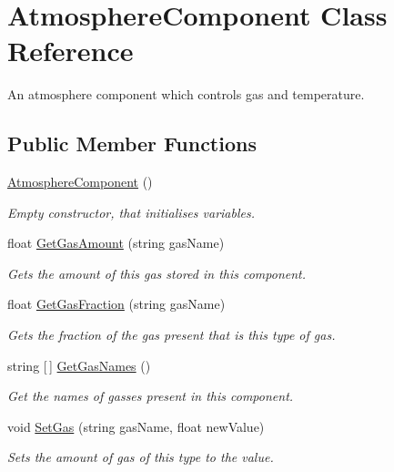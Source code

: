 \hypertarget{class_atmosphere_component}{}\section{Atmosphere\+Component Class Reference}
\label{class_atmosphere_component}


An atmosphere component which controls gas and temperature.  


\subsection*{Public Member Functions}
\begin{DoxyCompactItemize}
\item 
\hyperlink{class_atmosphere_component_aa1d8f0e689d42f6ae5663473406db9be}{Atmosphere\+Component} ()
\begin{DoxyCompactList}\small\item\em Empty constructor, that initialises variables. \end{DoxyCompactList}\item 
float \hyperlink{class_atmosphere_component_af15c6de153494ee1908429e72575b08b}{Get\+Gas\+Amount} (string gas\+Name)
\begin{DoxyCompactList}\small\item\em Gets the amount of this gas stored in this component. \end{DoxyCompactList}\item 
float \hyperlink{class_atmosphere_component_afb20b22d2f7601b7647a716c1baf4a27}{Get\+Gas\+Fraction} (string gas\+Name)
\begin{DoxyCompactList}\small\item\em Gets the fraction of the gas present that is this type of gas. \end{DoxyCompactList}\item 
string \mbox{[}$\,$\mbox{]} \hyperlink{class_atmosphere_component_a6a41cdeb590b5c1b4fe5336fc62039ab}{Get\+Gas\+Names} ()
\begin{DoxyCompactList}\small\item\em Get the names of gasses present in this component. \end{DoxyCompactList}\item 
void \hyperlink{class_atmosphere_component_a0dd1d74b73b45aac38e77297532a50f3}{Set\+Gas} (string gas\+Name, float new\+Value)
\begin{DoxyCompactList}\small\item\em Sets the amount of gas of this type to the value. \end{DoxyCompactList}\item 

\end{DoxyCompactItemize}
